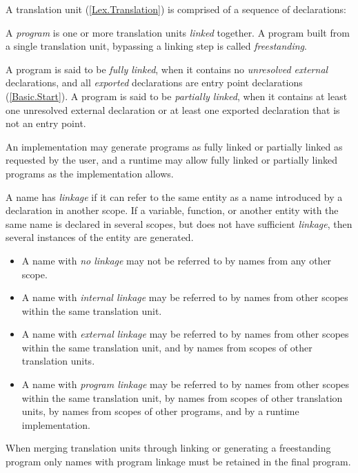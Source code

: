 \p A translation unit (\ref{Lex.Translation}) is comprised of a sequence of
declarations:

\begin{grammar}
  \br
\end{grammar}

\p A \textit{program} is one or more translation units \textit{linked} together.
A program built from a single translation unit, bypassing a linking step is
called \textit{freestanding}.

\p A program is said to be \textit{fully linked}, when it contains no
\textit{unresolved external} declarations, and all \textit{exported}
declarations are entry point declarations (\ref{Basic.Start}). A program is said
to be \textit{partially linked}, when it contains at least one unresolved
external declaration or at least one exported declaration that is not an entry
point.

\p An implementation may generate programs as fully linked or partially linked
as requested by the user, and a runtime may allow fully linked or partially
linked programs as the implementation allows.

\p A name has \textit{linkage} if it can refer to the same entity as a name
introduced by a declaration in another scope. If a variable, function, or
another entity with the same name is declared in several scopes, but does not
have sufficient \textit{linkage}, then several instances of the entity are
generated.

\begin{itemize}
\item A name with \textit{no linkage} may not be referred to by names from
any other scope.
\item A name with \textit{internal linkage} may be referred to by names
from other scopes within the same translation unit.
\item A name with \textit{external linkage} may be referred to by names from
other scopes within the same translation unit, and by names from scopes of other
translation units.
\item A name with \textit{program linkage} may be referred to by names from
other scopes within the same translation unit, by names from scopes of other
translation units, by names from scopes of other programs, and by a runtime
implementation.
\end{itemize}

\p When merging translation units through linking or generating a freestanding
program only names with program linkage must be retained in the final program.

